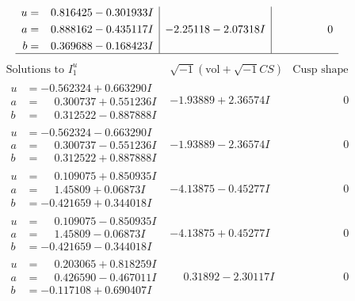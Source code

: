 \documentclass[1p]{elsarticle_modified}
\theoremstyle{definition}
\newcommand{\I}{\sqrt{-1}}
\begin{document}
$$\begin{array}{c|c|c}
\begin{aligned}
u &= \phantom{-}0.816425 - 0.301933 I \\
a &= \phantom{-}0.888162 - 0.435117 I \\
b &= \phantom{-}0.369688 - 0.168423 I\end{aligned}
 & -2.25118 - 2.07318 I & \phantom{-0.000000 } 0\\
 \hline 
 \end{array}$$\newpage$$\begin{array}{c|c|c}  
\text{Solutions to }I^u_{1}& \I (\text{vol} + \sqrt{-1}CS) & \text{Cusp shape}\\
 \hline 
\begin{aligned}
u &= -0.562324 + 0.663290 I \\
a &= \phantom{-}0.300737 + 0.551236 I \\
b &= \phantom{-}0.312522 - 0.887888 I\end{aligned}
 & -1.93889 + 2.36574 I & \phantom{-0.000000 } 0 \\ \hline\begin{aligned}
u &= -0.562324 - 0.663290 I \\
a &= \phantom{-}0.300737 - 0.551236 I \\
b &= \phantom{-}0.312522 + 0.887888 I\end{aligned}
 & -1.93889 - 2.36574 I & \phantom{-0.000000 } 0 \\ \hline\begin{aligned}
u &= \phantom{-}0.109075 + 0.850935 I \\
a &= \phantom{-}1.45809 + 0.06873 I \\
b &= -0.421659 + 0.344018 I\end{aligned}
 & -4.13875 - 0.45277 I & \phantom{-0.000000 } 0 \\ \hline\begin{aligned}
u &= \phantom{-}0.109075 - 0.850935 I \\
a &= \phantom{-}1.45809 - 0.06873 I \\
b &= -0.421659 - 0.344018 I\end{aligned}
 & -4.13875 + 0.45277 I & \phantom{-0.000000 } 0 \\ \hline\begin{aligned}
u &= \phantom{-}0.203065 + 0.818259 I \\
a &= \phantom{-}0.426590 - 0.467011 I \\
b &= -0.117108 + 0.690407 I\end{aligned}
 & \phantom{-}0.31892 - 2.30117 I & \phantom{-0.000000 } 0 \\ \hline\begin{aligned}

\end{aligned}
\end{array}$$
\end{document}
